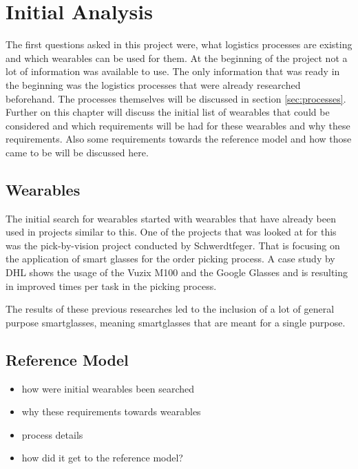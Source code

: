 \chapter{Initial Analysis}\label{cha:initialAnalysis}
The first questions asked in this project were, what logistics processes are existing and which wearables can be used for them. At the beginning of the project not a lot of information was available to use. The only information that was ready in the beginning was the logistics processes that were already researched beforehand. The processes themselves will be discussed in section \ref{sec:processes}. Further on this chapter will discuss the initial list of wearables that could be considered and which requirements will be had for these wearables and why these requirements. Also some requirements towards the reference model and how those came to be will be discussed here.

\section{Wearables}
The initial search for wearables started with wearables that have already been used in projects similar to this. One of the projects that was looked at for this was the pick-by-vision project conducted by Schwerdtfeger. \citep{phdthesis:pickByVision} That is focusing on the application of smart glasses for the order picking process. A case study by DHL shows the usage of the Vuzix M100 and the Google Glasses and is resulting in improved times per task in the picking process. \citep{caseStudy:dhlWearables} 


The results of these previous researches led to the inclusion of a lot of general purpose smartglasses, meaning smartglasses that are meant for a single purpose. 

\section{Reference Model}


\begin{itemize}
	\item how were initial wearables been searched
	\item why these requirements towards wearables
	\item process details
	\item how did it get to the reference model?
\end{itemize}